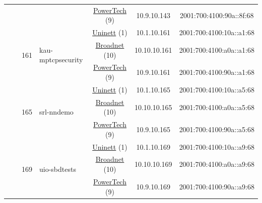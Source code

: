 \begin{small}
\begin{center}
\begin{longtable}{|c|c|c|c|c|c|c|c|}
  &  &  &  & \multicolumn{2}{|c|}{\tiny{\href{http://www.powertech.no}{PowerTech} (9)}} & \tiny{10.9.10.143} & \tiny{2001:700:4100:90a::8f:68} \\* \cline{3-3}\cline{4-4}\cline{5-5}\cline{6-6}\cline{7-7}\cline{8-8}
  &  & \multirow{3}{*}{\tiny{161}} & \multicolumn{1}{|l|}{\multirow{3}{*}{\tiny{kau-mptcpsecurity}}} & \multicolumn{2}{|c|}{\tiny{\href{https://www.uninett.no}{Uninett} (1)}} & \tiny{10.1.10.161} & \tiny{2001:700:4100:10a::a1:68} \\* \cline{5-5}\cline{6-6}\cline{7-7}\cline{8-8}
  &  &  &  & \multicolumn{2}{|c|}{\tiny{\href{https://www.broadnet.no}{Broadnet} (10)}} & \tiny{10.10.10.161} & \tiny{2001:700:4100:a0a::a1:68} \\* \cline{5-5}\cline{6-6}\cline{7-7}\cline{8-8}
  &  &  &  & \multicolumn{2}{|c|}{\tiny{\href{http://www.powertech.no}{PowerTech} (9)}} & \tiny{10.9.10.161} & \tiny{2001:700:4100:90a::a1:68} \\* \cline{3-3}\cline{4-4}\cline{5-5}\cline{6-6}\cline{7-7}\cline{8-8}
  &  & \multirow{3}{*}{\tiny{165}} & \multicolumn{1}{|l|}{\multirow{3}{*}{\tiny{srl-nndemo}}} & \multicolumn{2}{|c|}{\tiny{\href{https://www.uninett.no}{Uninett} (1)}} & \tiny{10.1.10.165} & \tiny{2001:700:4100:10a::a5:68} \\* \cline{5-5}\cline{6-6}\cline{7-7}\cline{8-8}
  &  &  &  & \multicolumn{2}{|c|}{\tiny{\href{https://www.broadnet.no}{Broadnet} (10)}} & \tiny{10.10.10.165} & \tiny{2001:700:4100:a0a::a5:68} \\* \cline{5-5}\cline{6-6}\cline{7-7}\cline{8-8}
  &  &  &  & \multicolumn{2}{|c|}{\tiny{\href{http://www.powertech.no}{PowerTech} (9)}} & \tiny{10.9.10.165} & \tiny{2001:700:4100:90a::a5:68} \\* \cline{3-3}\cline{4-4}\cline{5-5}\cline{6-6}\cline{7-7}\cline{8-8}
  &  & \multirow{3}{*}{\tiny{169}} & \multicolumn{1}{|l|}{\multirow{3}{*}{\tiny{uio-sbdtests}}} & \multicolumn{2}{|c|}{\tiny{\href{https://www.uninett.no}{Uninett} (1)}} & \tiny{10.1.10.169} & \tiny{2001:700:4100:10a::a9:68} \\* \cline{5-5}\cline{6-6}\cline{7-7}\cline{8-8}
  &  &  &  & \multicolumn{2}{|c|}{\tiny{\href{https://www.broadnet.no}{Broadnet} (10)}} & \tiny{10.10.10.169} & \tiny{2001:700:4100:a0a::a9:68} \\* \cline{5-5}\cline{6-6}\cline{7-7}\cline{8-8}
  &  &  &  & \multicolumn{2}{|c|}{\tiny{\href{http://www.powertech.no}{PowerTech} (9)}} & \tiny{10.9.10.169} & \tiny{2001:700:4100:90a::a9:68} \\* \cline{3-3}\cline{4-4}\cline{5-5}\cline{6-6}\cline{7-7}\cline{8-8}

\end{longtable}
\end{center}
\end{small}
